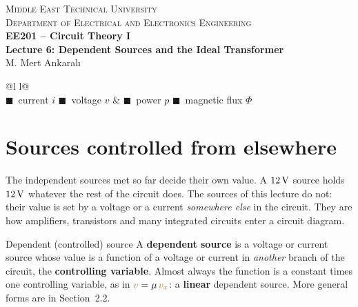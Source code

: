\documentclass[11pt,a4paper]{article}
\newcommand{\Icol}[1]{\textcolor{ccur}{#1}}
\newcommand{\Vcol}[1]{\textcolor{cvolt}{#1}}
\newcommand{\Pcol}[1]{\textcolor{cpow}{#1}}
\newcommand{\Fcol}[1]{\textcolor{cflux}{#1}}
\begin{document}
\begin{center}
\begin{tcolorbox}[enhanced, colback=metured!5, colframe=metured, boxrule=1pt,
                  arc=3pt, left=10pt,right=10pt,top=7pt,bottom=7pt, width=\textwidth]
\begin{center}
  {\small\scshape Middle East Technical University}\\[2pt]
  {\small\scshape Department of Electrical and Electronics Engineering}\\[7pt]
  {\Large\bfseries\color{metured} EE201 -- Circuit Theory I}\\[4pt]
  {\large\bfseries Lecture 6: Dependent Sources and the Ideal Transformer}\\[6pt]
  {\small M. Mert Ankaralı}
\end{center}
\end{tcolorbox}
\end{center}
\vspace{-0.5em}

\begin{center}
\small
\begin{tabular}{@{}l l@{}}
\toprule
{}\\
\midrule
\Icol{$\blacksquare$}~current $i$ \quad \Vcol{$\blacksquare$}~voltage $v$ &
\Pcol{$\blacksquare$}~power $p$ \quad \Fcol{$\blacksquare$}~magnetic flux $\Phi$\\
\bottomrule
\end{tabular}
\end{center}

\section{Sources controlled from elsewhere}

The independent sources met so far decide their own value. A $12\,\mathrm{V}$ source holds $12\,\mathrm{V}$ whatever the
rest of the circuit does. The sources of this lecture do not: their value is set by a
voltage or a current \emph{somewhere else} in the circuit. They are how amplifiers,
transistors and many integrated circuits enter a circuit diagram.

\begin{definitionbox}{Dependent (controlled) source}
A \textbf{dependent source} is a voltage or current source whose value is a function of a
voltage or current in \emph{another} branch of the circuit, the \textbf{controlling
variable}. Almost always the function is a constant times one controlling variable, as in
$\Vcol{v} = \mu\,\Vcol{v_x}$: a \textbf{linear} dependent source. More general forms are
in Section~2.2.
\end{definitionbox}
\end{document}
